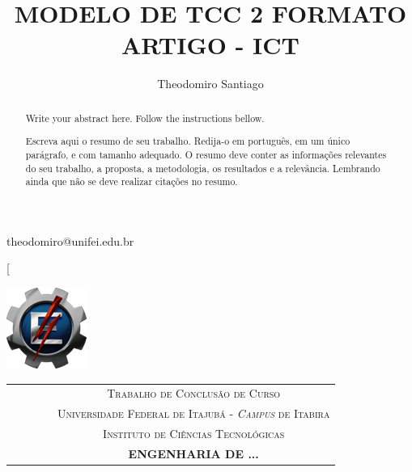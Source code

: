 \documentclass[conference,harvard,brazil,english]{icttcc}
\begin{document}
\sloppy


\title{MODELO DE TCC 2 FORMATO ARTIGO - ICT}

\author{Theodomiro Santiago}{theodomiro@unifei.edu.br}
\address{Universidade Federal de Itajubá - \textit{Campus} de Itabira\\ Rua Irmã Ivone Drumond, 200 - Distrito Industrial II - 35903-087\\ Itabira, Minas Gerais, Brasil}

\twocolumn[

\flushleft
\begin{minipage}{2cm}
\includegraphics{Figuras/unifei.png}
\end{minipage}
\begin{minipage}{7cm}
\begin{tabular}{ccccc}
 & & & & \large \textsc{Trabalho de Conclusão de Curso}  \\
 & & & & \large \textsc{Universidade Federal de Itajubá - \textit{Campus} de Itabira} \\
  & & & & \large \textsc{Instituto de Ciências Tecnológicas} \\
 & & & & \large \textbf{\textsc{ENGENHARIA DE ...}}  
\end{tabular}
\end{minipage}

\vspace{1.5cm}

\maketitle

\begin{abstract}
Write your abstract here. Follow the instructions bellow.

\end{abstract}


\begin{abstract}
Escreva aqui o resumo de seu trabalho. Redija-o em português, em um único parágrafo, e com tamanho adequado. O resumo deve conter as informações relevantes do seu trabalho, a proposta, a metodologia, os resultados e a relevância. Lembrando ainda que não se deve realizar citações no resumo.
\end{abstract}
\end{document}
